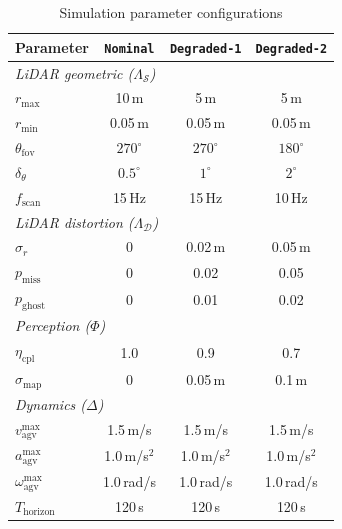 \documentclass[conference]{IEEEtran}
\begin{document}
\begin{table}[htbp]
    \caption{Simulation parameter configurations}
    \label{tab:sim-params}
    \begin{center}
        \begin{tabular}{|l|c|c|c|}
            \hline
            \textbf{Parameter} & \textbf{\texttt{Nominal}} & \textbf{\texttt{Degraded-1}} & \textbf{\texttt{Degraded-2}} \\
            \hline
            \multicolumn{4}{|l|}{\emph{LiDAR geometric ($\Lambda_{\mathcal{S}}$)}} \\
            \hline
            $r_{\max}$ & 10\,m & 5\,m & 5\,m \\
            $r_{\min}$ & 0.05\,m & 0.05\,m & 0.05\,m \\
            $\theta_{\text{fov}}$ & $270^{\circ}$ & $270^{\circ}$ & $180^{\circ}$ \\
            $\delta_\theta$ & $0.5^{\circ}$ & $1^{\circ}$ & $2^{\circ}$ \\
            $f_{\text{scan}}$ & 15\,Hz & 15\,Hz & 10\,Hz \\
            \hline
            \multicolumn{4}{|l|}{\emph{LiDAR distortion ($\Lambda_{\mathcal{D}}$)}} \\
            \hline
            $\sigma_r$ & 0 & 0.02\,m & 0.05\,m \\
            $p_{\text{miss}}$ & 0 & 0.02 & 0.05 \\
            $p_{\text{ghost}}$ & 0 & 0.01 & 0.02 \\
            \hline
            \multicolumn{4}{|l|}{\emph{Perception ($\Phi$)}} \\
            \hline
            $\eta_{\text{cpl}}$ & 1.0 & 0.9 & 0.7 \\
            $\sigma_{\text{map}}$ & 0 & 0.05\,m & 0.1\,m \\
            \hline
            \multicolumn{4}{|l|}{\emph{Dynamics ($\Delta$)}} \\
            \hline
            $v_{\text{agv}}^{\max}$ & 1.5\,m/s & 1.5\,m/s & 1.5\,m/s \\
            $a_{\text{agv}}^{\max}$ & 1.0\,m/s$^2$ & 1.0\,m/s$^2$ & 1.0\,m/s$^2$ \\
            $\omega_{\text{agv}}^{\max}$ & 1.0\,rad/s & 1.0\,rad/s & 1.0\,rad/s \\
            $T_{\text{horizon}}$ & 120\,s & 120\,s & 120\,s \\
            \hline
        \end{tabular}
    \end{center}
    \vspace{-7px}
\end{table}
\end{document}
